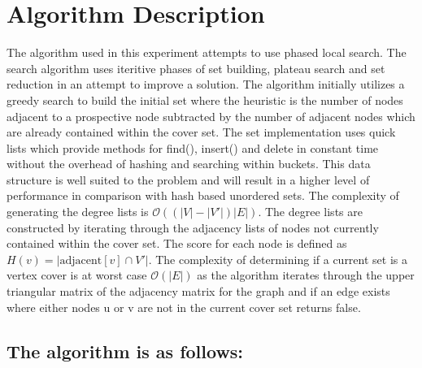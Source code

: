 \documentclass[conference,letterpaper]{IEEEtran}
\begin{document}
\section{Algorithm Description}
\par The algorithm used in this experiment attempts to use phased local search. The search algorithm uses iteritive phases of set building, plateau search and set reduction in an attempt to improve a solution. The algorithm initially utilizes a greedy search to build the initial set where the heuristic is the number of nodes adjacent to a prospective node subtracted by the number of adjacent nodes which are already contained within the cover set. The set implementation uses quick lists which provide methods for find(), insert() and delete in constant time without the overhead of hashing and searching within buckets. This data structure is well suited to the problem and will result in a higher level of performance in comparison with hash based unordered sets. The complexity of generating the degree lists is $\mathcal{O}((|V| - |V\prime|)|E|)$. The degree lists are constructed by iterating through the adjacency lists of nodes not currently contained within the cover set. The score for each node is defined as $H(v)=|\mbox{adjacent}[v] \cap V\prime|$. The complexity of determining if a current set is a vertex cover is at worst case $\mathcal{O}(|E|)$ as the algorithm iterates through the upper triangular matrix of the adjacency matrix for the graph and if an edge exists where either nodes u or v are not in the current cover set returns false.

\subsection{The algorithm is as follows:}

\end{document}
